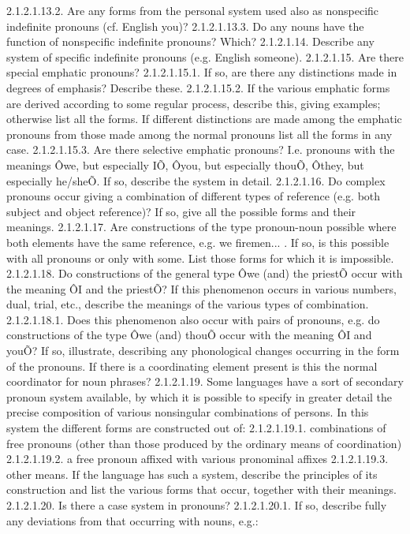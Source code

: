 2.1.2.1.13.2. Are any forms from the personal system used also as nonspecific indefinite pronouns (cf. English you)?
2.1.2.1.13.3. Do any nouns have the function of nonspecific indefinite pronouns? Which?
2.1.2.1.14. Describe any system of specific indefinite pronouns (e.g. English someone).
2.1.2.1.15. Are there special emphatic pronouns?
2.1.2.1.15.1. If so, are there any distinctions made in degrees of emphasis? Describe these.
2.1.2.1.15.2. If the various emphatic forms are derived according to some regular process, describe this, giving examples; otherwise list all the forms. If different distinctions are made among the emphatic pronouns from those made among the normal pronouns list all the forms in any case.
2.1.2.1.15.3. Are there selective emphatic pronouns? I.e. pronouns with the meanings Ôwe, but especially IÕ, Ôyou, but especially thouÕ, Ôthey, but especially he/sheÕ. If so, describe the system in detail.
2.1.2.1.16. Do complex pronouns occur giving a combination of different types of reference (e.g. both subject and object reference)? If so, give all the possible forms and their meanings.
2.1.2.1.17. Are constructions of the type pronoun-noun possible where both elements have the same reference, e.g. we firemen... . If so, is this possible with all pronouns or only with some. List those forms for which it is impossible.
2.1.2.1.18. Do constructions of the general type Ôwe (and) the priestÕ occur with the meaning ÔI and the priestÕ? If this phenomenon occurs in various numbers, dual, trial, etc., describe the meanings of the various types of combination.
2.1.2.1.18.1. Does this phenomenon also occur with pairs of pronouns, e.g. do constructions of the type Ôwe (and) thouÕ occur with the meaning ÔI and youÕ? If so, illustrate, describing any phonological changes occurring in the form of the pronouns. If there is a coordinating element present is this the normal coordinator for noun phrases?
2.1.2.1.19. Some languages have a sort of secondary pronoun system available, by which it is possible to specify in greater detail the precise composition of various nonsingular combinations of persons. In this system the different forms are constructed out of:
2.1.2.1.19.1. combinations of free pronouns (other than those produced by the ordinary means of coordination)
2.1.2.1.19.2. a free pronoun affixed with various pronominal affixes
2.1.2.1.19.3. other means.
If the language has such a system, describe the principles of its construction and list the various forms that occur, together with their meanings.
2.1.2.1.20. Is there a case system in pronouns?
2.1.2.1.20.1. If so, describe fully any deviations from that occurring with nouns, e.g.:
